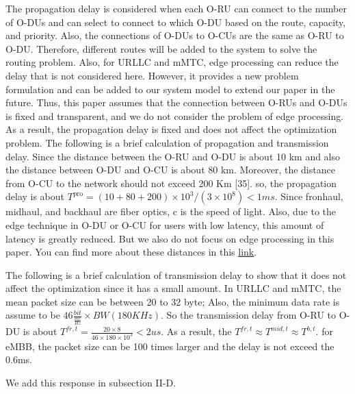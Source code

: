 \documentclass[12pt, letterpaper]{article}
\begin{document}
The propagation delay is considered when each O-RU can connect to the number of O-DUs and can select to connect to which O-DU based on the route, capacity, and priority. Also, the connections of O-DUs to O-CUs are the same as O-RU to O-DU. Therefore, different routes will be added to the system to solve the routing problem. Also, for URLLC and mMTC, edge processing can reduce the delay that is not considered here.
However, it provides a new problem formulation and can be added to our system model to extend our paper in the future. Thus, this paper assumes that the connection between O-RUs and O-DUs is fixed and transparent, and we do not consider the problem of edge processing. As a result, the propagation delay is fixed and does not affect the optimization problem. The following is a brief calculation of propagation and transmission delay.
Since the distance between the O-RU and O-DU is about 10 km and also the distance between O-DU and O-CU is about 80 km. Moreover, the distance from O-CU to the network should not exceed 200 Km [35]. so, the propagation delay is about $T^{\text{pro}} = (10 + 80 + 200)\times 10^3 /(3\times 10^8) < 1ms $. Since fronhaul, midhaul, and backhaul are fiber optics, c is the speed of light. Also, due to the edge technique in O-DU or O-CU for users with low latency, this amount of latency is greatly reduced. But we also do not focus on edge processing in this paper. You can find more about these distances in this \href{https://blogs.keysight.com/blogs/inds.entry.html/2020/06/30/5g_testing_what_is-0nzj.html\%23:~:text=The\%20data\%20requirements\%20are\%20about,DUs\%20is\%20about\%2080\%20km.}{link}.

The following is a brief calculation of transmission delay to show that it does not affect the optimization since it has a small amount.
In URLLC and mMTC, the mean packet size can be between 20 to 32 byte; Also, the minimum data rate is assume to be $46 \frac{bit}{\frac{sec}{Hz}} \times BW (180 KHz)$. So the transmission delay from O-RU to O-DU is about $T^{fr,t} = \frac{20\times 8}{46 \times 180 \times 10^3} < 2 us$. As a result, the $T^{fr,t} \approx T^{mid,t} \approx T^{b,t}$. for eMBB, the packet size can be 100 times larger and the delay is not exceed the 0.6ms.  

We add this response in subsection II-D.
\end{document}
